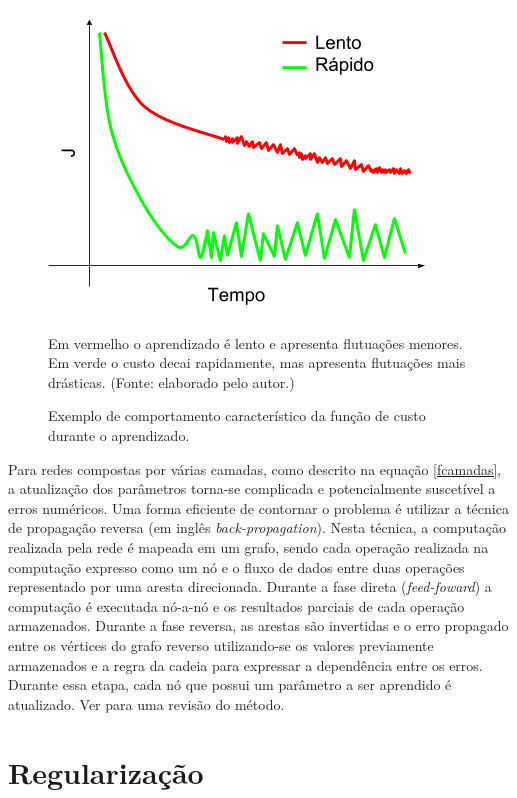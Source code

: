 \begin{figure}[ht]
	\caption{Exemplo de comportamento característico da função de custo durante o aprendizado.}
	\begin{center}
	\includegraphics[width=.6\linewidth]{figuras/convergence.png}
	\end{center}
	\small Em vermelho o aprendizado é lento e apresenta flutuações menores. Em verde o custo decai rapidamente, mas apresenta flutuações mais drásticas. (Fonte: elaborado pelo autor.)
	\label{convergence}
\end{figure}


Para redes compostas por várias camadas, como descrito na equação \ref{fcamadas}, a atualização dos parâmetros torna-se complicada e potencialmente suscetível a erros numéricos. Uma forma eficiente de contornar o problema é utilizar a técnica de propagação reversa (em inglês \textit{back-propagation}). Nesta técnica, a computação realizada pela rede é mapeada em um grafo, sendo cada operação realizada na computação expresso como um nó e o fluxo de dados entre duas operações representado por uma aresta direcionada. Durante a fase direta (\textit{feed-foward}) a computação é executada nó-a-nó e os resultados parciais de cada operação armazenados. Durante a fase reversa, as arestas são invertidas e o erro propagado entre os vértices do grafo reverso utilizando-se os valores previamente armazenados e a regra da cadeia para expressar a dependência entre os erros. Durante essa etapa, cada nó que possui um parâmetro a ser aprendido é atualizado. Ver \cite{jurgenReview2015} para uma revisão do método.


\section{Regularização}

